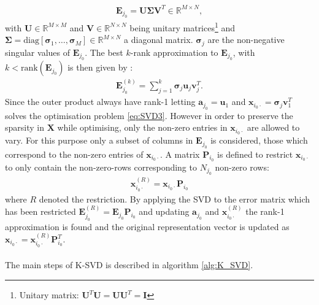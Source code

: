 \begin{align*}
\mathbf{E}_{j_0} = \textbf{U} \boldsymbol{\Sigma} \textbf{V}^T \in \mathbb{R}^{M\times N},
\end{align*}
with $\textbf{U} \in \mathbb{R}^{M\times M}$ and $\textbf{V} \in \mathbb{R}^{N\times N}$ being unitary matrices\footnote{Unitary matrix: $\textbf{U}^T\textbf{U}=\textbf{UU}^T=\textbf{I}$} and $\boldsymbol{\Sigma} = \text{diag}\left[\boldsymbol{\sigma}_1, \dots, \boldsymbol{\sigma}_M \right] \in \mathbb{R}^{M \times N}$ a diagonal matrix. $\boldsymbol{\sigma}_j$ are the non-negative singular values of $\textbf{E}_{j_0}$. 
The best $k$-rank approximation to $\textbf{E}_{j_0}$, with $k < \text{rank}(\textbf{E}_{j_0})$ is then given by : 
\begin{align*}
\textbf{E}_{j_{0}}^{(k)} = \sum_{j=1}^{k} \boldsymbol{\sigma}_j \textbf{u}_{j} \textbf{v}_{j}^T.
\end{align*} 
Since the outer product always have rank-1 letting $\textbf{a}_{j_0} = \textbf{u}_1$ and $\textbf{x}_{i_0 \cdot} = \boldsymbol{\sigma}_{j} \textbf{v}_{1}^T$ solves the optimisation problem \eqref{eq:SVD3}.
However in order to preserve the sparsity in $\textbf{X}$ while optimising, only the non-zero entries in $\textbf{x}_{i_0 \cdot}$ are allowed to vary. For this purpose only a subset of columns in $\textbf{E}_{j_0}$ is considered, those which correspond to the non-zero entries of $\textbf{x}_{i_0 \cdot}$. A matrix $\textbf{P}_{i_0}$ is defined to restrict $\textbf{x}_{i_0 \cdot}$ to only contain the non-zero-rows corresponding to $N_{j_0}$ non-zero rows:
\begin{align*}
\textbf{x}_{i_0 \cdot}^{(R)} = \textbf{x}_{i_0 \cdot} \textbf{P}_{i_0}
\end{align*}
where $R$ denoted the restriction. By applying the SVD to the error matrix which has been restricted $\textbf{E}_{j_0}^{(R)} = \textbf{E}_{j_0} \textbf{P}_{i_0}$ and updating $\textbf{a}_{j_0}$ and $\textbf{x}_{i_0 \cdot}^{(R)}$ the rank-1 approximation is found and the original representation vector is updated as $\textbf{x}_{i_0 \cdot} = \textbf{x}_{i_0 \cdot}^{(R)} \textbf{P}_{i_0}^{T}$.  
\\ \\
The main steps of K-SVD is described in algorithm \ref{alg:K_SVD}. 
